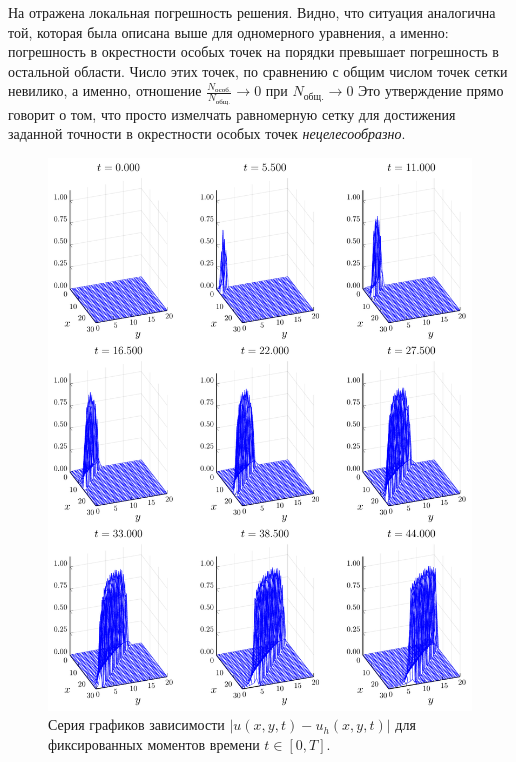 На  отражена локальная погрешность решения.
Видно, что ситуация аналогична той, которая была описана выше для одномерного уравнения, а именно: погрешность в окрестности особых точек на порядки превышает погрешность в остальной области.
Число этих точек, по сравнению с общим числом точек сетки невилико, а именно, отношение 
$
    \frac{N_{\text{особ.}}}{N_{\text{общ.}}} \rightarrow 0
$
при
$
    N_{\text{общ.}} \rightarrow 0
$
Это утверждение прямо говорит о том, что просто измелчать равномерную сетку для достижения заданной точности в окрестности особых точек \emph{нецелесообразно}.
\begin{figure}
    \centering
    \includegraphics[width=\textwidth, keepaspectratio]{Разностные_схемы_на_статических_сетках/Программный_код_примеры_расчётов/explicit_scheme/problem_3_loc_err_wireframe.pdf}
    \caption{Серия графиков зависимости $|u(x, y, t) - u_h(x, y, t)|$ для фиксированных моментов времени $t \in [0, T]$.}
    \label{fig:problem_3_err}
\end{figure}